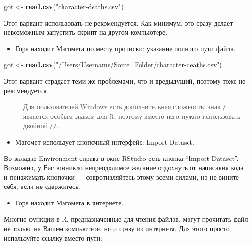 \documentclass[]{book}
\newenvironment{Shaded}{\begin{snugshade}}{\end{snugshade}}
\newcommand{\KeywordTok}[1]{\textcolor[rgb]{0.13,0.29,0.53}{\textbf{#1}}}
\newcommand{\NormalTok}[1]{#1}
\newcommand{\StringTok}[1]{\textcolor[rgb]{0.31,0.60,0.02}{#1}}
\providecommand{\tightlist}{%
  \setlength{\itemsep}{0pt}\setlength{\parskip}{0pt}}
\begin{document}
\begin{Shaded}
\begin{Highlighting}[]
\NormalTok{got <-}\StringTok{ }\KeywordTok{read.csv}\NormalTok{(}\StringTok{"character-deaths.csv"}\NormalTok{)}
\end{Highlighting}
\end{Shaded}

Этот вариант использовать не рекомендуется. Как минимум, это сразу делает невозможным запустить скрипт на другом компьютере.

\begin{itemize}
\tightlist
\item
  Гора находит Магомета по месту прописки: указание полного пути файла.
\end{itemize}

\begin{Shaded}
\begin{Highlighting}[]
\NormalTok{got <-}\StringTok{ }\KeywordTok{read.csv}\NormalTok{(}\StringTok{"/Users/Username/Some_Folder/character-deaths.csv"}\NormalTok{)}
\end{Highlighting}
\end{Shaded}

Этот вариант страдает теми же проблемами, что и предыдущий, поэтому тоже не рекомендуется.

\begin{quote}
Для пользователей Windows есть дополнительная сложность: знак \texttt{/} является особым знаком для R, поэтому вместо него нужно использовать двойной \texttt{//}.
\end{quote}

\begin{itemize}
\tightlist
\item
  Магомет использует кнопочный интерфейс: Import Dataset.
\end{itemize}

Во вкладке Environment справа в окне RStudio есть кнопка ``Import Dataset''. Возможно, у Вас возникло непреодолимое желание отдохнуть от написания кода и понажимать кнопочки --- сопротивляйтесь этому всеми силами, но не вините себя, если не сдержитесь.

\begin{itemize}
\tightlist
\item
  Гора находит Магомета в интернете.
\end{itemize}

Многие функции в R, предназначенные для чтения файлов, могут прочитать файл не только на Вашем компьютере, но и сразу из интернета. Для этого просто используйте ссылку вместо пути:
\end{document}
